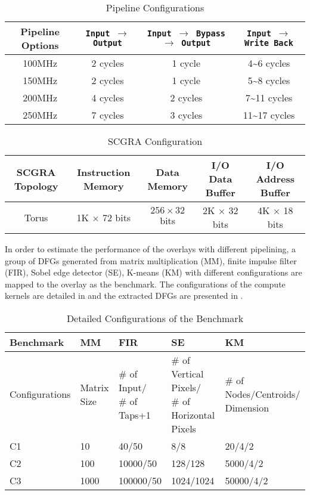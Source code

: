 \begin{table}
\footnotesize
\caption{Pipeline Configurations \label{tab:pipeline-config}}{
\centering
\begin{tabular}{c|c|c|c}
\hline
{Pipeline Options} & {\texttt{Input $\rightarrow$ Output}} & \tabincell{l}{\texttt{Input $\rightarrow$ Bypass} \\ \texttt{$\rightarrow$ Output}} & {\texttt{Input $\rightarrow$ Write Back}} \\ \hline
{100MHz} & {2 cycles} & {1 cycle} & {4\~{}6 cycles} \\ \hline
{150MHz} & {2 cycles} & {1 cycle} & {5\~{}8 cycles} \\ \hline
{200MHz} & {4 cycles} & {2 cycles} & {7\~{}11 cycles} \\ \hline
{250MHz} & {7 cycles} & {3 cycles} & {11\~{}17 cycles} \\ \hline
\end{tabular}
}
\end{table}

\begin{table}
\footnotesize
\caption{SCGRA Configuration \label{tab:basic-config}}{
\centering
\begin{tabular}{c|c|c|c|c}
\hline
{SCGRA Topology} & {Instruction Memory} & {Data Memory} & {I/O Data Buffer} & {I/O Address Buffer} \\ \hline
{Torus} & {1K $\times$ 72 bits} & {$256 \times 32$ bits} & {2K $\times$ 32 bits} & {4K $\times$ 18 bits} \\ \hline
\end{tabular}
}
\end{table}

In order to estimate the performance of the overlays with different pipelining, a group of DFGs generated from matrix multiplication (MM), finite impulse filter (FIR), Sobel edge detector (SE), K-means (KM) with different configurations are mapped to the overlay as the benchmark. The configurations of the compute kernels are detailed in  and the extracted DFGs are presented in . 

\begin{table}
\footnotesize
\centering
  \caption{Detailed Configurations of the Benchmark 
  \label{tab:benchmark-config}}{
  \centering
  \begin{tabular}{l|l|l|l|l}
  \hline
  Benchmark & MM & FIR & SE & KM \\ \hline
  Configurations & Matrix Size & \tabincell{l}{\# of Input/\\ \# of Taps+1} & \tabincell{l}{ \# of Vertical Pixels/\\ \# of Horizontal Pixels} & \tabincell{l}{\# of Nodes/Centroids/\\Dimension} \\ \hline
  C1 & 10 & 40/50 & 8/8 & 20/4/2 \\ \hline
  C2 & 100 & 10000/50 & 128/128 & 5000/4/2 \\ \hline
  C3 & 1000 & 100000/50 & 1024/1024 & 50000/4/2 \\ \hline
  \end{tabular}
  }
\end{table}

